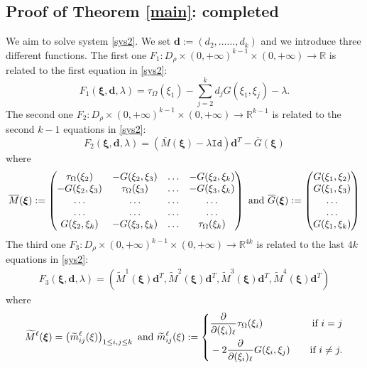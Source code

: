 \documentclass[11pt,a4paper]{amsart}
\theoremstyle{definition}
\renewcommand{\(}{\left(}
\renewcommand{\)}{\right)}
\begin{document}
\subsection{Proof of Theorem \ref{main}: completed}
We aim to solve system \eqref{sys2}. We set
$\mathbf{d}:=(d_2,\ldots\ldots, d_k)$ and we  introduce three different functions.
The first one $F_1: D_\rho \times (0, +\infty)^{k-1}\times (0, +\infty)\to\mathbb R$
is related to the first equation in \eqref{sys2}:
$$ F_1(\boldsymbol\xi, \mathbf{d}, \lambda)= \tau_\Omega(\xi_1)-\sum_{j=2}^k d_j G(\xi_1, \xi_j)-\lambda.$$
The second one  $F_2:D_\rho \times (0, +\infty)^{k-1}\times (0, +\infty)\to\mathbb R^{k-1}$
is related to the second $k-1$ equations in \eqref{sys2}:
$$F_2(\boldsymbol\xi, \mathbf{d}, \lambda)=\left(\overline M(\boldsymbol\xi)-\lambda \mathtt{Id}\right)\mathbf{d}^T-\overline G(\boldsymbol\xi)$$
where $$\overline M(\boldsymbol\xi) :=\left(\begin{matrix} \tau_\Omega(\xi_2) & -G(\xi_2, \xi_3) & \ldots & -G(\xi_2, \xi_k)\\
-G(\xi_2, \xi_3) & \tau_\Omega(\xi_3) &\ldots &-G(\xi_3, \xi_k)\\
\ldots &\ldots &\ldots &\ldots\\
\ldots &\ldots &\ldots &\ldots\\
G(\xi_2, \xi_k) & -G(\xi_3, \xi_k) & \ldots &\tau_\Omega(\xi_k)
\end{matrix}\right)\ \hbox{and}\ \overline G(\boldsymbol\xi):=\left(\begin{matrix} G(\xi_1, \xi_2)\\ G(\xi_1, \xi_3) \\
\ldots \\
\ldots \\
G(\xi_1, \xi_k) 
\end{matrix}\right)$$
The third one $F_3:D_\rho \times (0, +\infty)^{k-1}\times (0, +\infty)\to\mathbb R^{4k}$
is related to the last $4k$ equations in \eqref{sys2}:
$$\begin{aligned}F_3 (\boldsymbol\xi, \mathbf{d}, \lambda)= \left(\widetilde M^1(\boldsymbol\xi)\mathbf{d}^T, \widetilde M^2(\boldsymbol\xi)\mathbf{d}^T, \widetilde M^3(\boldsymbol\xi)\mathbf{d}^T, \widetilde M^4(\boldsymbol\xi)\mathbf{d}^T\right)\end{aligned}$$
where
\begin{equation}\label{tildeMxi}\widetilde M^\ell(\boldsymbol\xi)=\(\widetilde m_{ij}^\ell(\xi)\)_{1\leq i, j\leq k}\ \hbox{and}\ \widetilde m_{ij}^\ell(\xi):=\left\{\begin{aligned}&\frac{\partial}{\partial(\xi_i)_\ell}  \tau_\Omega(\xi_i)\quad \ \ \ & \mbox{if}\,\, i=j\\
&-2\frac{\partial}{\partial(\xi_i)_\ell}  G(\xi_i, \xi_j)\quad &\mbox{if}\,\, i\neq j.\\
\end{aligned}\right.\end{equation}
\end{document}
